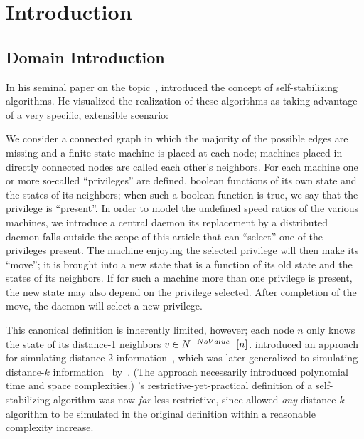 \section{Introduction}
\label{sec:introduction}
\subsection{Domain Introduction}
In his seminal paper on the topic~\autocite{dew:sem},
  \citeauthor{dew:sem} introduced the concept of
  self-stabilizing algorithms.
He visualized the realization of these algorithms as taking advantage of
  a very specific, extensible scenario:
\begin{displayquote}
  We consider a connected graph in which
    the majority of the possible edges are missing and
    a finite state machine is placed at each node;
    machines placed in directly connected nodes are called each other's neighbors.
  For each machine one or more so-called \enquote{privileges} are defined,
    \ie boolean functions of its own state and the states of its neighbors;
    when such a boolean function is true,
    we say that the privilege is \enquote{present}.
  In order to model the undefined speed ratios of the various machines,
    we introduce a central daemon \Dash
    its replacement by a distributed daemon falls outside the scope of this article \Dash
    that can \enquote{select} one of the privileges present.
  The machine enjoying the selected privilege will then make its \enquote{move};
    \ie it is brought into a new state that is a function of
    its old state and the states of its neighbors.
  If for such a machine more than one privilege is present,
    the new state may also depend on the privilege selected.
  After completion of the move, the daemon will select a new privilege.
\end{displayquote}
This canonical definition is inherently limited, however;
  each node $n$ only knows the state of its distance-1 neighbors $v \in \ClosedNeighborhood{n}$.
\citeauthor{gairing:distance-2} introduced an approach for
  simulating distance-2 information~\autocite{gairing:distance-2},
  which was later generalized to simulating distance-$k$
  information~\autocite{goddard:ssa--k-distance} by~\citeauthor{goddard:ssa--k-distance}.
  (The approach necessarily introduced polynomial time and space complexities.)
\citeauthor{dew:sem}'s restrictive-yet-practical definition
  of a self-stabilizing algorithm
  was now \emph{far} less restrictive,
  since \citeauthor{goddard:ssa--k-distance} allowed \emph{any} distance-$k$ algorithm
  to be simulated in the original definition within a reasonable complexity increase.

